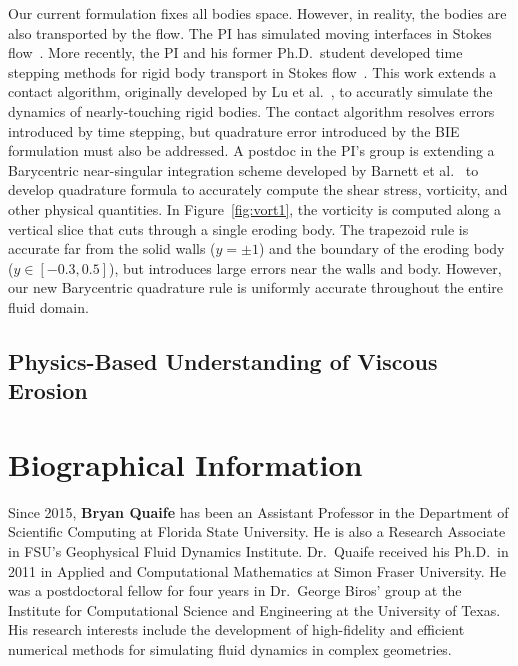 \documentclass[11pt]{article}
\begin{document}
Our current formulation fixes all bodies space.  However, in reality,
the bodies are also transported by the flow.  The PI has simulated
moving interfaces in Stokes flow~\cite{qua-bir2015b, qua-bir2014,
qua-bir2016}. More recently, the PI and his former Ph.D.~student
developed time stepping methods for rigid body transport in Stokes
flow~\cite{bys-sha-qua2018}.  This work extends a contact algorithm,
originally developed by Lu et al.~\cite{lu-rah-zor2017}, to accuratly
simulate the dynamics of nearly-touching rigid bodies.  The contact
algorithm resolves errors introduced by time stepping, but quadrature
error introduced by the BIE formulation must also be addressed.  A
postdoc in the PI's group is extending a Barycentric near-singular
integration scheme developed by Barnett et al.~\cite{bar-wu-vee2015} to
develop quadrature formula to accurately compute the shear stress,
vorticity, and other physical quantities.  In Figure~\ref{fig:vort1},
the vorticity is computed along a vertical slice that cuts through a
single eroding body.  The trapezoid rule is accurate far from the solid
walls ($y = \pm 1$) and the boundary of the eroding body ($y \in
[-0.3,0.5]$), but introduces large errors near the walls and body.
However, our new Barycentric quadrature rule is uniformly accurate
throughout the entire fluid domain.


\subsection{Physics-Based Understanding of Viscous Erosion}

\section{Biographical Information}
Since 2015, {\bf Bryan Quaife} has been an Assistant Professor in the
Department of Scientific Computing at Florida State University.  He is
also a Research Associate in FSU's Geophysical Fluid Dynamics Institute.
Dr.~Quaife received his Ph.D.~in 2011 in Applied and Computational
Mathematics at Simon Fraser University.  He was a postdoctoral fellow
for four years in Dr.~George Biros' group at the Institute for
Computational Science and Engineering at the University of Texas.  His
research interests include the development of  high-fidelity and
efficient numerical methods for simulating fluid dynamics in complex
geometries.
\end{document}
